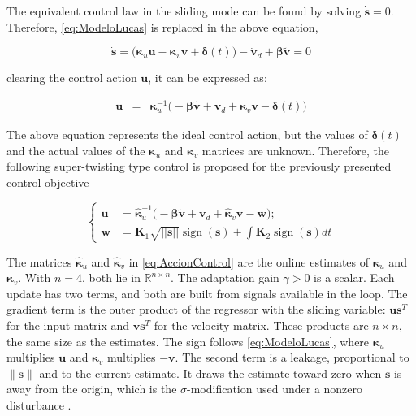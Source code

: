 \documentclass[sn-mathphys-num]{sn-jnl}
\DeclareMathOperator{\sign}{sign}
\theoremstyle{thmstyleone}%
\theoremstyle{thmstyletwo}%
\theoremstyle{thmstylethree}%
\begin{document}
The equivalent control law in the sliding mode can be found by solving $\dot{\mathbf{s}}=0$. Therefore, \eqref{eq:ModeloLucas} is replaced in the above equation,

\begin{equation}\label{eq:Condicion_S}
    \dot{\mathbf{s}} = \Big(\boldsymbol{\kappa}_u\mathbf{u} - \boldsymbol{\kappa}_v\mathbf{v}+\boldsymbol{\delta}(t)\Big) - 
    \dot{\mathbf{v}}_d + \boldsymbol{\beta} \tilde{\mathbf{v}} = 0
\end{equation}

clearing the control action $\mathbf{u}$, it can be expressed as:

\begin{eqnarray}\label{eq:AccionIdeal}
    \mathbf{u} &=& \boldsymbol{\kappa}_u^{-1}\Big( -\boldsymbol{\beta} \tilde{\mathbf{v}} + \dot{\mathbf{v}}_d + \boldsymbol{\kappa}_v \mathbf{v} -\boldsymbol{\delta}(t)\Big) 
\end{eqnarray}

The above equation represents the ideal control action, but the values of $\boldsymbol{\delta}(t)$ and the actual values of the $\boldsymbol{\kappa}_u$ and $\boldsymbol{\kappa}_v$ matrices are unknown. Therefore, the following super-twisting type control is proposed for the previously presented control objective

\begin{equation}\label{eq:AccionControl}
\left\{
\begin{aligned}  
    \mathbf{u} &= \hat{\boldsymbol{\kappa}}_u^{-1}\Big( -\boldsymbol{\beta} \tilde{\mathbf{v}} + \dot{\mathbf{v}}_d + \hat{\boldsymbol{\kappa}}_v \mathbf{v} - \mathbf{w}\Big) ; \\
    \mathbf{w} &= \mathbf{K}_1\sqrt{||\mathbf{s}||}\sign(\mathbf{s}) + \int \mathbf{K}_2\sign(\mathbf{s}) dt
\end{aligned}
\right.
\end{equation}

The matrices \(\hat{\boldsymbol{\kappa}}_u\) and \(\hat{\boldsymbol{\kappa}}_v\) in \eqref{eq:AccionControl} are the online estimates of \(\boldsymbol{\kappa}_u\) and \(\boldsymbol{\kappa}_v\). With \(n=4\), both lie in \(\mathbb{R}^{n\times n}\). The adaptation gain \(\gamma>0\) is a scalar. Each update has two terms, and both are built from signals available in the loop. The gradient term is the outer product of the regressor with the sliding variable: \(\mathbf{u}\mathbf{s}^{T}\) for the input matrix and \(\mathbf{v}\mathbf{s}^{T}\) for the velocity matrix. These products are \(n\times n\), the same size as the estimates. The sign follows \eqref{eq:ModeloLucas}, where \(\boldsymbol{\kappa}_u\) multiplies \(\mathbf{u}\) and \(\boldsymbol{\kappa}_v\) multiplies \(-\mathbf{v}\). The second term is a leakage, proportional to \(\|\mathbf{s}\|\) and to the current estimate. It draws the estimate toward zero when \(\mathbf{s}\) is away from the origin, which is the \(\sigma\)-modification used under a nonzero disturbance \cite{lewis1998neural,ge2001stable}.
\end{document}
